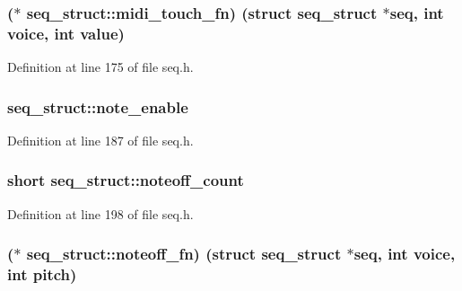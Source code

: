 \subsubsection[{\texorpdfstring{midi\+\_\+touch\+\_\+fn}{midi_touch_fn}}]{($\ast$ seq\+\_\+struct\+::midi\+\_\+touch\+\_\+fn) (struct {\bf seq\+\_\+struct} $\ast$seq, {\bf int} {\bf voice}, {\bf int} {\bf value})}\hypertarget{structseq__struct_ab6693e3eecd47c3e43879bc2d86e388e}{}\label{structseq__struct_ab6693e3eecd47c3e43879bc2d86e388e}


Definition at line 175 of file seq.\+h.

\subsubsection[{\texorpdfstring{note\+\_\+enable}{note_enable}}]{ seq\+\_\+struct\+::note\+\_\+enable}\hypertarget{structseq__struct_af4d8037a9e74145536960972c33c6b0c}{}\label{structseq__struct_af4d8037a9e74145536960972c33c6b0c}


Definition at line 187 of file seq.\+h.

\subsubsection[{\texorpdfstring{noteoff\+\_\+count}{noteoff_count}}]{\setlength{\rightskip}{0pt plus 5cm}short seq\+\_\+struct\+::noteoff\+\_\+count}\hypertarget{structseq__struct_a58e1400a36176f7d7df42e38a2534945}{}\label{structseq__struct_a58e1400a36176f7d7df42e38a2534945}


Definition at line 198 of file seq.\+h.

\subsubsection[{\texorpdfstring{noteoff\+\_\+fn}{noteoff_fn}}]{($\ast$ seq\+\_\+struct\+::noteoff\+\_\+fn) (struct {\bf seq\+\_\+struct} $\ast$seq, {\bf int} {\bf voice}, {\bf int} {\bf pitch})}\hypertarget{structseq__struct_a05d000bb501d7e26bbe4ac3182e0b172}{}\label{structseq__struct_a05d000bb501d7e26bbe4ac3182e0b172}


